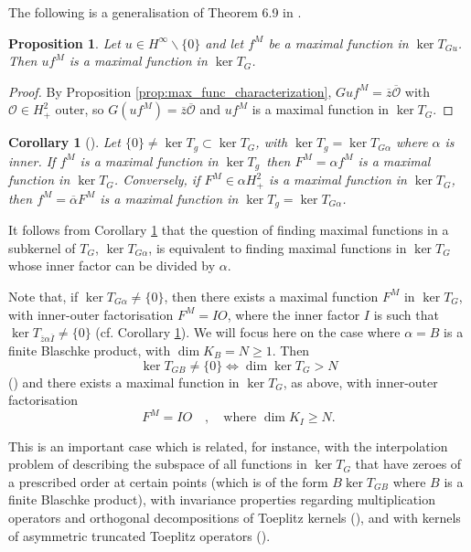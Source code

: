 \documentclass{article}
\numberwithin{equation}{section}
\theoremstyle{plain}
\newtheorem{prop}[thm]{Proposition}
\newtheorem{cor}[thm]{Corollary}
\newcommand{\Hp}{\ensuremath{H^2_+}}
\newcommand{\Hinf}{\ensuremath{H^\infty}}
\newcommand{\OO}{\ensuremath{\mathcal{O}}}
\newcommand{\ol}[1]{\ensuremath{\overline{#1}}}
\newcommand{\bs}{\backslash}
\newcommand{\zero}{\ensuremath{\{0\}}}
\newcommand{\kertg}{\ensuremath{\ker T_g}}
\begin{document}
The following is a generalisation of Theorem 6.9 in \cite{CMP16}.


\begin{prop}
\label{prop:max_func_subkernel_times_u+_gives_max_func_big_kernel}
Let $u\in\Hinf\bs\zero$ and let $f^M$ be a maximal function in $\ker T_{G u}$.
Then $u f^M$ is a maximal function in $\ker T_G$.
\end{prop}

\begin{proof}
By Proposition \ref{prop:max_func_characterization}, $G u f^M = \ol z \ol\OO$ with $\OO\in\Hp$ outer, so $G (u f^M) = \ol z \ol\OO$ and $u f^M$ is a maximal function in $\ker T_G$.
\end{proof}


\begin{cor}[{\cite{CMP16}}]
\label{cor:max_func_subkernel}
Let $\zero \neq \kertg \subset \ker T_G$, with $\kertg = \ker T_{G \alpha}$ where $\alpha$ is inner.
If $f^M$ is a maximal function in \kertg\ then $F^M = \alpha f^M$ is a maximal function in $\ker T_G$.
Conversely, if $F^M \in \alpha \Hp$ is a maximal function in $\ker T_G$, then $f^M = \ol\alpha F^M$ is a maximal function in $\kertg = \ker T_{G \alpha}$.
\end{cor}


It follows from Corollary \ref{cor:max_func_subkernel} that the question of finding  maximal functions in a subkernel of $T_G$, $\ker T_{G \alpha}$, is equivalent to finding maximal functions in $\ker T_G$ whose inner factor can be divided by $\alpha$.


Note that, if $\ker T_{G\alpha} \neq \zero$, then there exists a maximal function $F^M$ in $\ker T_G$, with inner-outer factorisation $F^M = IO$, where the inner factor $I$ is such that $\ker T_{\ol z \alpha \ol I} \neq\zero$ (cf. Corollary \ref{cor:max_func_subkernel}).
We will focus here on the case where $\alpha = B$ is a finite Blaschke product, with $\dim K_B =N \geq 1$.
Then
\begin{equation}
\ker T_{GB} \neq\zero \iff \dim \ker T_G >N
\end{equation}
(\cite{CMP16}) and there exists a maximal function in $\ker T_G$, as above, with inner-outer factorisation
\begin{equation}
F^M = IO \quad , \quad \text{where } \dim K_I \geq N.
\end{equation}

This is an important case which is related, for instance, with the interpolation problem of describing the subspace of all functions in $\ker T_G$ that have zeroes of a prescribed order at certain points (which is of the form $B \ker T_{GB}$ where $B$ is a finite Blaschke product),
with invariance properties regarding multiplication operators and orthogonal decompositions of Toeplitz kernels (\cite{CaKlisPtak24_XYinv}),
and with kernels of asymmetric truncated Toeplitz operators (\cite{CP24}).
\end{document}
